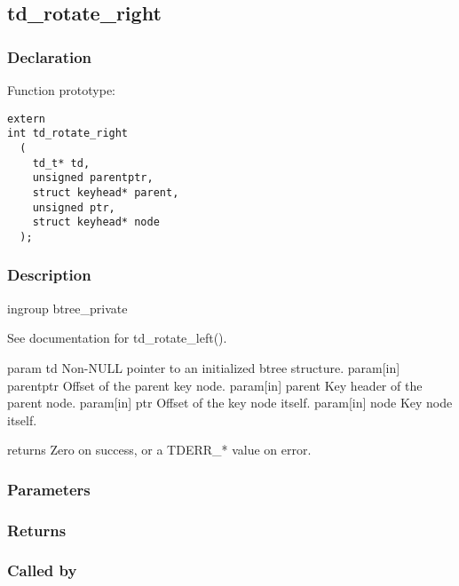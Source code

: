 
\newpage
\subsection{td\_rotate\_right}
\subsubsection{Declaration} Function prototype:

\begin{verbatim}
extern
int td_rotate_right
  (
    td_t* td,
    unsigned parentptr,
    struct keyhead* parent,
    unsigned ptr,
    struct keyhead* node
  );
\end{verbatim}

\subsubsection{Description}


 ingroup btree\_private

 See documentation for td\_rotate\_left().

 param td Non-NULL pointer to an initialized btree structure.
 param[in] parentptr Offset of the parent key node.
 param[in] parent Key header of the parent node.
 param[in] ptr Offset of the key node itself.
 param[in] node Key node itself.

 returns Zero on success, or a TDERR\_* value on error.
 

\subsubsection{Parameters}
\subsubsection{Returns}
\subsubsection{Called by}
